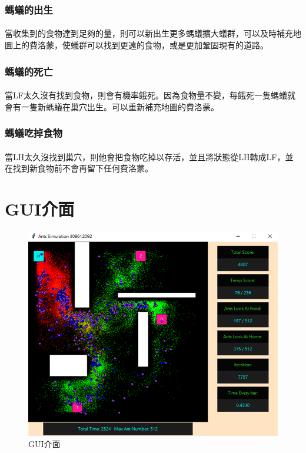 \documentclass[]{article}
\begin{document}
\subsubsection{螞蟻的出生}
\label{algo:colony:born}
\paragraph{}
當收集到的食物達到足夠的量，則可以新出生更多螞蟻擴大蟻群，可以及時補充地圖上的費洛蒙，使蟻群可以找到更遠的食物，或是更加鞏固現有的道路。
\subsubsection{螞蟻的死亡}
\label{algo:colony:death}
\paragraph{}
當LF太久沒有找到食物，則會有機率餓死。因為食物量不變，每餓死一隻螞蟻就會有一隻新螞蟻在巢穴出生。可以重新補充地圖的費洛蒙。
\subsubsection{螞蟻吃掉食物}
\label{algo:colony:eatFood}
\paragraph{}
當LH太久沒找到巢穴，則他會把食物吃掉以存活，並且將狀態從LH轉成LF，並在找到新食物前不會再留下任何費洛蒙。

\clearpage
\section{GUI介面}
\label{interface}
\begin{figure}[htbp]
	\centering
	\includegraphics[width=1.0\linewidth]{../interface}
	\caption{GUI介面}
	\label{interface:fig}
\end{figure}
\end{document}
